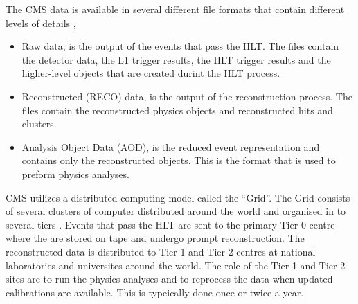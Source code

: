 The {CMS} data is available in several different file formats that contain
different levels of details \cite{grandi2004cms},
\begin{itemize}
\item Raw data, is the output of the events that pass the {HLT}. The files
contain the detector data, the {L1} trigger results, the {HLT} trigger
results and the higher-level objects that are created durint the {HLT}
process.
\item Reconstructed (RECO) data, is the output of the reconstruction process.
The files contain the reconstructed physics objects and reconstructed hits and
clusters.
\item Analysis Object Data (AOD), is the reduced event representation and
contains only the reconstructed objects. This is the format that is used to
preform physics analyses.
\end{itemize}

CMS utilizes a distributed computing model called the ``Grid''.
The Grid consists of several clusters of computer distributed around the world
and organised in to several tiers \cite{grandi2004cms}.
Events that pass the {HLT} are sent to the primary Tier-0 centre where the
are stored on tape and undergo prompt reconstruction. The reconstructed data is
distributed to Tier-1 and Tier-2 centres at national laboratories and
universites around the world. The role of the Tier-1 and Tier-2 sites are to run
the physics analyses and to reprocess the data when updated calibrations are
available. This is typeically done once or twice a year.


